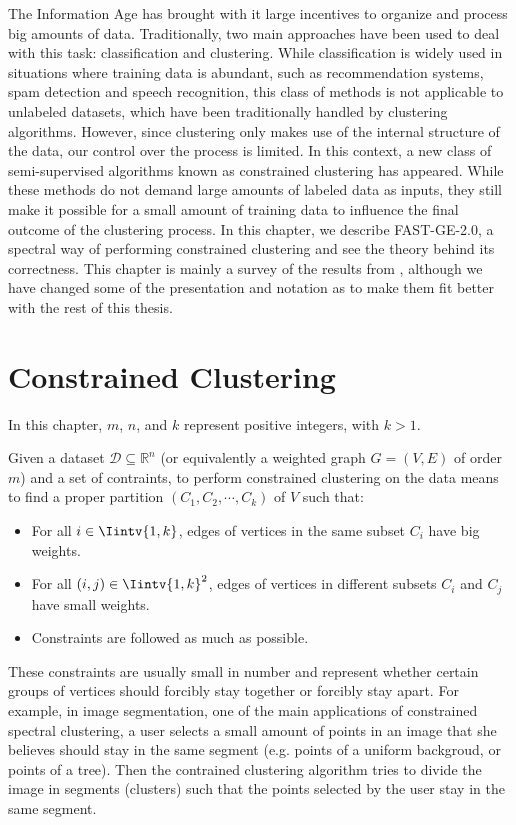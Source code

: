The Information Age has brought with it large incentives to organize and process big amounts of data.
Traditionally, two main approaches have been used to deal with this task: classification and clustering.
While classification is widely used in situations where training data is abundant, such as recommendation systems, spam detection and speech recognition, this class of methods is not applicable to unlabeled datasets, which have been traditionally handled by clustering algorithms.
However, since clustering only makes use of the internal structure of the data, our control over the process is limited.
In this context, a new class of semi-supervised algorithms known as constrained clustering has appeared.
While these methods do not demand large amounts of labeled data as inputs, they still make it possible for a small amount of training data to influence the final outcome of the clustering process.
In this chapter, we describe FAST-GE-2.0, a spectral way of performing constrained clustering and see the theory behind its correctness.
This chapter is mainly a survey of the results from \cite{fastge2}, although we have changed some of the presentation and notation as to make them fit better with the rest of this thesis.

\section{Constrained Clustering}
In this chapter, $m$, $n$, and $k$ represent positive integers, with $k > 1$.

Given a dataset $\mathcal D \subseteq \mathbb{R}^{n }$ (or equivalently a weighted graph $G = (V,E)$ of order $m$) and a set of contraints, to perform constrained clustering on the data means to find a proper partition $(C_1, C_2, \cdots, C_k)$ of $V$ such that:
\begin{itemize}
   \item For all $i \in \Iintv{1,k}$, edges of vertices in the same subset $C_i$ have big weights.
   \item For all $(i,j) \in \Iintv{1,k}^2$, edges of vertices in different subsets $C_i$ and $C_j$ have small weights.
   \item Constraints are followed as much as possible.
\end{itemize}
These constraints are usually small in number and represent whether certain groups of vertices should forcibly stay together or forcibly stay apart.
For example, in image segmentation, one of the main applications of constrained spectral clustering, a user selects a small amount of points in an image that she believes should stay in the same segment (e.g. points of a uniform backgroud, or points of a tree). Then the contrained clustering algorithm tries to divide the image in segments (clusters) such that the points selected by the user stay in the same segment.



